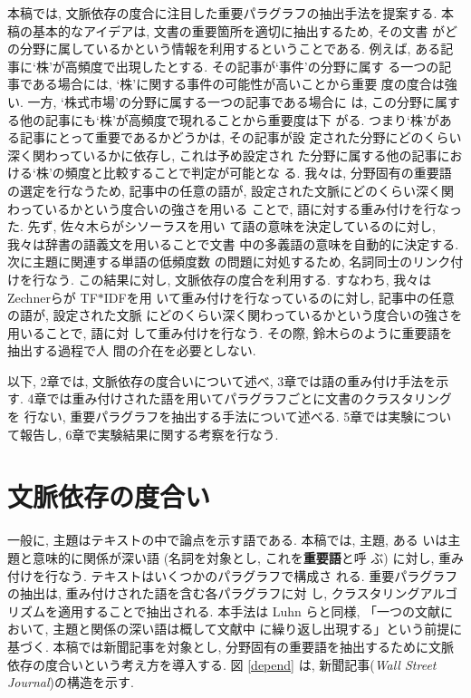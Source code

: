 本稿では, 文脈依存の度合に注目した重要パラグラフの抽出手法を提案する.
本稿の基本的なアイデアは, 文書の重要箇所を適切に抽出するため, その文書
がどの分野に属しているかという情報を利用するということである.  例えば, 
ある記事に`株'が高頻度で出現したとする.  その記事が`事件'の分野に属す
る一つの記事である場合には, `株'に関する事件の可能性が高いことから重要
度の度合は強い.  一方, `株式市場'の分野に属する一つの記事である場合に
は, この分野に属する他の記事にも`株'が高頻度で現れることから重要度は下
がる.  つまり`株'がある記事にとって重要であるかどうかは, その記事が設
定された分野にどのくらい深く関わっているかに依存し, これは予め設定され
た分野に属する他の記事における`株'の頻度と比較することで判定が可能とな
る.  我々は, 分野固有の重要語の選定を行なうため, 記事中の任意の語が, 
設定された文脈にどのくらい深く関わっているかという度合いの強さを用いる
ことで, 語に対する重み付けを行なった.  先ず, 佐々木らがシソーラスを用い
て語の意味を決定しているのに対し, 我々は辞書の語義文を用いることで文書
中の多義語の意味を自動的に決定する.  次に主題に関連する単語の低頻度数
の問題に対処するため, 名詞同士のリンク付けを行なう.  この結果に対し, 
文脈依存の度合を利用する.  すなわち, 我々はZechnerらが TF$\ast$IDFを用
いて重み付けを行なっているのに対し, 記事中の任意の語が, 設定された文脈
にどのくらい深く関わっているかという度合いの強さを用いることで, 語に対
して重み付けを行なう.  その際, 鈴木らのように重要語を抽出する過程で人
間の介在を必要としない.

以下, 2章では, 文脈依存の度合いについて述べ, 3章では語の重み付け手法を示す.
4章では重み付けされた語を用いてパラグラフごとに文書のクラスタリングを
行ない, 重要パラグラフを抽出する手法について述べる.  5章では実験につい
て報告し, 6章で実験結果に関する考察を行なう.

\section{文脈依存の度合い}

一般に, 主題はテキストの中で論点を示す語である.  本稿では, 主題, ある
いは主題と意味的に関係が深い語 (名詞を対象とし, これを{\bf 重要語}と呼
ぶ) に対し, 重み付けを行なう.  テキストはいくつかのパラグラフで構成さ
れる.  重要パラグラフの抽出は, 重み付けされた語を含む各パラグラフに対
し, クラスタリングアルゴリズムを適用することで抽出される.  本手法は 
Luhn らと同様, 「一つの文献において, 主題と関係の深い語は概して文献中
に繰り返し出現する」という前提に基づく.  本稿では新聞記事を対象とし, 
分野固有の重要語を抽出するために文脈依存の度合いという考え方を導入する.
図
\ref{depend} は, 新聞記事({\it Wall Street Journal})の構造を示す.

